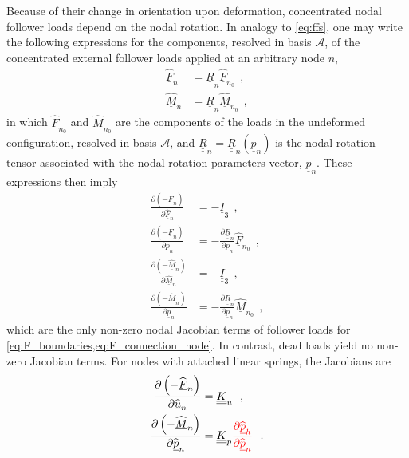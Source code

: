 \documentclass[12pt,a4paper,oneside,english]{abntex2} %
\newcommand{\fix}[1]{{\color{red}#1}}
\newcommand{\vect}[1]{\underline{#1}}
\newcommand{\del}[2]{\frac{\partial#1}{\partial#2}}
\def\tens#1{\underline{\underline{#1}}}
\def\lp{\left(}
\def\rp{\right)}
\def\A{\mathcal{A}}
\def\Ithree{\tens{I}_3}
\def\R{\tens{R}}
\def\u{\vect{u}}
\def\uhat{\widehat{\u}}
\def\p{\vect{p}}
\def\phat{\widehat{\p}}
\def\F{\vect{F}}
\def\Fhat{\widehat{\F}}
\def\M{\vect{M}}
\def\Mhat{\widehat{\M}}
\begin{document}
\begin{apendicesenv}
Because of their change in orientation upon deformation, concentrated nodal follower loads depend on the nodal rotation. In analogy to \cref{eq:ffs}, one may write the following expressions for the components, resolved in basis $\A$, of the concentrated external follower loads applied at an arbitrary node $n$, 
\begin{equation}
\begin{aligned}
    \Fhat_n &= \R_n\Fhat_{n_0} \ \ ,
    \\
    \Mhat_n &= \R_n\Mhat_{n_0} \ \ ,
    \label{eq:FMhatn}
\end{aligned}
\end{equation}
in which $\Fhat_{n_0}$ and $\Mhat_{n_0}$ are the components of the loads in the undeformed configuration, resolved in basis $\A$, and $\R_n = \R_n(\p_n)$ is the nodal rotation tensor associated with the nodal rotation parameters vector, $\p_n$. These expressions then imply
\begin{equation}
\begin{aligned}
    \del{\lp-\Fhat_n\rp}{\Fhat_n} &= -\Ithree \ \ ,
    \\
    \del{\lp-\Fhat_n\rp}{\p_n} &= -\del{\R_n}{\p_n}\Fhat_{n_0} \ \ ,
    \\
    \del{\lp-\Mhat_n\rp}{\Mhat_n} &= -\Ithree \ \ ,
    \\
    \del{\lp-\Mhat_n\rp}{\p_n} &= -\del{\R_n}{\p_n}\Mhat_{n_0} \ \ ,
    \label{eq:dfMhatn}
\end{aligned}
\end{equation}
which are the only non-zero nodal Jacobian terms of follower loads for \cref{eq:F_boundaries,eq:F_connection_node}. In contrast, dead loads yield no non-zero Jacobian terms. For nodes with attached \fix{linear} springs, the Jacobians are
\begin{equation}
\begin{aligned}
    \del{\lp-\Fhat_n\rp}{\uhat_n} &= \tens{K}_u \ \ ,
    \\
    \del{\lp-\Mhat_n\rp}{\phat_n} &= \tens{K}_p\fix{\del{\phat_h}{\phat_n}} \ \ .
\end{aligned}
\end{equation}

\end{apendicesenv}
\end{document}
